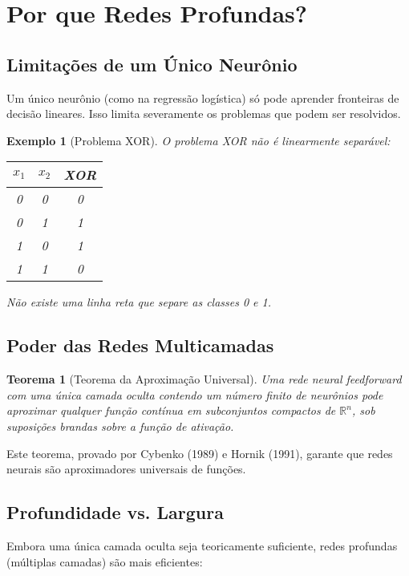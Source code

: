 \documentclass[a4paper,12pt]{article}
\newtheorem{teorema}{Teorema}[section]
\newtheorem{exemplo}{Exemplo}[section]
\begin{document}
\section{Por que Redes Profundas?}

\subsection{Limitações de um Único Neurônio}

Um único neurônio (como na regressão logística) só pode aprender fronteiras de decisão lineares. Isso limita severamente os problemas que podem ser resolvidos.

\begin{exemplo}[Problema XOR]
O problema XOR não é linearmente separável:
\begin{center}
\begin{tabular}{cc|c}
$x_1$ & $x_2$ & XOR \\
\hline
0 & 0 & 0 \\
0 & 1 & 1 \\
1 & 0 & 1 \\
1 & 1 & 0 \\
\end{tabular}
\end{center}

Não existe uma linha reta que separe as classes 0 e 1.
\end{exemplo}

\subsection{Poder das Redes Multicamadas}

\begin{teorema}[Teorema da Aproximação Universal]
Uma rede neural feedforward com uma única camada oculta contendo um número finito de neurônios pode aproximar qualquer função contínua em subconjuntos compactos de $\mathbb{R}^n$, sob suposições brandas sobre a função de ativação.
\end{teorema}

Este teorema, provado por Cybenko (1989) e Hornik (1991), garante que redes neurais são aproximadores universais de funções.

\subsection{Profundidade vs. Largura}

Embora uma única camada oculta seja teoricamente suficiente, redes profundas (múltiplas camadas) são mais eficientes:
\end{document}
